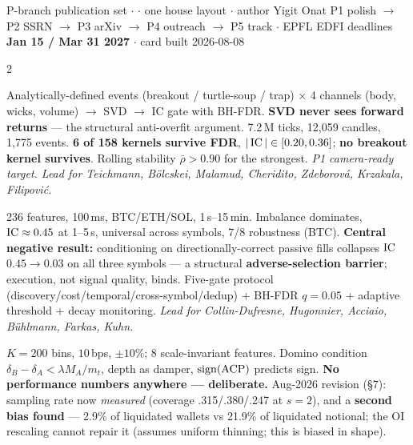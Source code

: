 \documentclass[10pt,a4paper]{article}
\begin{document}
\footnotesize

{P-branch publication set $\cdot$  $\cdot$ one house layout
 $\cdot$ author Yigit Onat }
{P1 polish $\to$ P2 SSRN $\to$ P3 arXiv  $\to$ P4 outreach $\to$ P5 track
 $\cdot$ EPFL EDFI deadlines \textbf{Jan 15 / Mar 31 2027} $\cdot$ card built 2026-08-08}

\begin{multicols}{2}

Analytically-defined events (breakout / turtle-soup / trap) $\times$ 4 channels (body, wicks, volume)
$\to$ SVD $\to$ IC gate with BH-FDR. \textbf{SVD never sees forward returns} — the structural
anti-overfit argument. 7.2\,M ticks, 12,059 candles, 1,775 events. \textbf{6 of 158 kernels survive FDR},
$|\operatorname{IC}|\in[0.20,0.36]$; \textbf{no breakout kernel survives}. Rolling stability $\bar\rho>0.90$ for the
strongest. 
\emph{P1 camera-ready target. Lead for Teichmann, Bölcskei, Malamud, Cheridito, Zdeborová, Krzakala,
Filipović.}

236 features, 100\,ms, BTC/ETH/SOL, 1\,s--15\,min. Imbalance dominates, $\operatorname{IC}\approx0.45$ at 1--5\,s,
universal across symbols, 7/8 robustness (BTC). \textbf{Central negative result:} conditioning on
directionally-correct passive fills collapses $\operatorname{IC}$ $0.45\to0.03$ on all three symbols — a structural
\textbf{adverse-selection barrier}; execution, not signal quality, binds. Five-gate protocol
(discovery/cost/temporal/cross-symbol/dedup) + BH-FDR $q{=}0.05$ + adaptive threshold + decay monitoring.
\emph{Lead for Collin-Dufresne, Hugonnier, Acciaio, Bühlmann, Farkas, Kuhn.}

$K{=}200$ bins, $10$\,bps, $\pm10\%$; 8 scale-invariant features. Domino condition
$\delta_B-\delta_A<\lambda M_A/m_t$, depth as damper, $\operatorname{sign}(\mathrm{ACP})$ predicts sign. \textbf{No
performance numbers anywhere — deliberate.} Aug-2026 revision (§7): sampling rate now \emph{measured}
(coverage .315/.380/.247 at $s{=}2$), and a \textbf{second bias found} — 2.9\% of liquidated wallets vs
21.9\% of liquidated notional; the OI rescaling cannot repair it (assumes uniform thinning; this is
biased in shape). 


\end{multicols}
\end{document}
